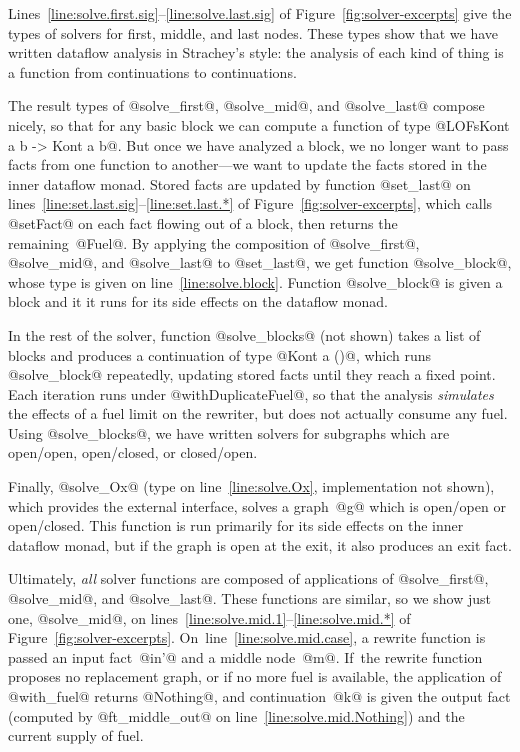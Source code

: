 \documentclass[blockstyle,preprint,natbib,nocopyrightspace]{sigplanconf}
\newcommand\lineref[1]{line~\ref{line:#1}}
\newcommand\linerangeref[2]{\mbox{lines~\ref{line:#1}--\ref{line:#2}}}
\newcommand\Linerangeref[2]{\mbox{Lines~\ref{line:#1}--\ref{line:#2}}}
\newcommand\figref[1]{Figure~\ref{fig:#1}}
\begin{document}
\Linerangeref{solve.first.sig}{solve.last.sig} of
\figref{solver-excerpts} give the types of
solvers for first, middle, and last nodes.
These types show that we have written dataflow analysis in Strachey's
style:
the analysis of each kind of thing is a function from continuations to
continuations. 

The result types of @solve_first@, @solve_mid@, and @solve_last@
compose nicely, so that for any basic block we can compute a function
of type
@LOFsKont a b -> Kont a b@.
But once we have analyzed a block, we no longer want to pass facts
from one function to another---we want to update the facts stored in
the inner dataflow monad.
Stored facts are updated by function @set_last@ on
\linerangeref{set.last.sig}{set.last.*} of 
\figref{solver-excerpts}, which calls @setFact@ on each fact
flowing out of a block, then returns the remaining~@Fuel@.
By applying the composition
of @solve_first@, @solve_mid@, and @solve_last@ to @set_last@, we get
function @solve_block@, whose type is given on \lineref{solve.block}.
Function @solve_block@ is given a block and it
it runs for its side effects on the dataflow monad.

In the rest of the solver,
function @solve_blocks@ (not shown) takes a list of blocks and
produces a continuation of type @Kont a ()@, which
runs @solve_block@ repeatedly,
updating stored facts until they reach a
fixed point.
Each iteration runs under @withDuplicateFuel@, so that the analysis
\emph{simulates} the effects of a fuel limit on the rewriter, but does
not actually consume any fuel.
Using @solve_blocks@, we have written solvers for subgraphs which are open/open,
open/closed, or closed/open.

Finally, @solve_Ox@ (type on \lineref{solve.Ox}, implementation not
shown), which provides the external interface, 
solves a graph~@g@ which is open/open or open/closed.
This function is run primarily for its
side effects on the inner
dataflow monad, but if the graph is open at the exit, it also produces
an exit fact.

Ultimately, \emph{all} solver functions
are composed of applications of @solve_first@,
@solve_mid@, and @solve_last@.
These functions are similar, so we show just one,
@solve_mid@, on
\linerangeref{solve.mid.1}{solve.mid.*} of \figref{solver-excerpts}.
On~\lineref{solve.mid.case}, a rewrite function is passed an
input fact~@in'@ and a middle node~@m@.
If~the rewrite function proposes no replacement graph, 
or if no more fuel is available, the application of @with_fuel@
returns @Nothing@, and continuation~@k@ is given the output fact
(computed by @ft_middle_out@ on \lineref{solve.mid.Nothing}) and
the current supply of fuel.
\end{document}
